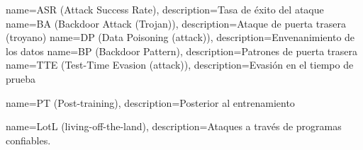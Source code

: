   {name={ASR (Attack Success Rate)},          description={Tasa de éxito del ataque}}
   {name={BA (Backdoor Attack (Trojan))},      description={Ataque de puerta trasera (troyano)}}
   {name={DP (Data Poisoning (attack))},       description={Envenanimiento de los datos}}
   {name={BP (Backdoor Pattern)},              description={Patrones de puerta trasera}}
  {name={TTE (Test-Time Evasion (attack))},   description={Evasión en el tiempo de prueba}}


  {name={PT (Post-training)},   description={Posterior al entrenamiento}}


  {name={LotL (living-off-the-land)},   description={Ataques a través de programas confiables.}}

